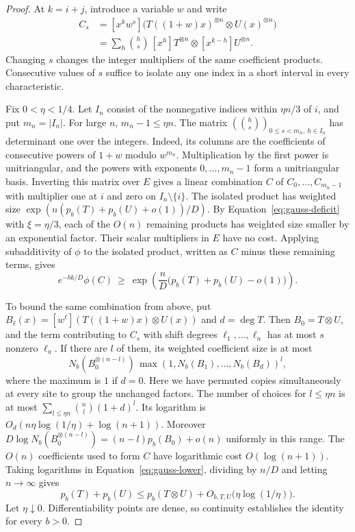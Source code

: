 \begin{proof}
At $k=i+j$, introduce a variable $w$ and write
\[
\begin{aligned}
 C_s
 &= [x^k w^s]\bigl(T((1+w)x)^{\otimes n}\otimes U(x)^{\otimes n}\bigr)\\
 &= \sum_h \binom hs\, [x^h]T^{\otimes n}\otimes[x^{k-h}]U^{\otimes n}.
\end{aligned}
\]
Changing $s$ changes the integer multipliers of the same coefficient
products. Consecutive values of $s$ suffice to isolate any one
index in a short interval in every characteristic.

Fix $0<\eta<1/4$. Let $I_n$ consist of the nonnegative indices within
$\eta n/3$ of $i$, and put $m_n=|I_n|$. For large $n$,
$m_n-1\le\eta n$. The matrix
$(\binom hs)_{0\le s<m_n,\ h\in I_n}$ has determinant one over
the integers. Indeed, its columns are the coefficients of consecutive
powers of $1+w$ modulo $w^{m_n}$. Multiplication by the first power is
unitriangular, and the powers with exponents $0,\ldots,m_n-1$ form
a unitriangular basis. Inverting this matrix over $E$ gives a linear
combination $C$ of $C_0,\ldots,C_{m_n-1}$ with multiplier one at $i$
and zero on $I_n\setminus\{i\}$. The isolated product has weighted
size $\exp(n(p_b(T)+p_b(U)+o(1))/D)$. By
Equation~\eqref{eq:gauss-deficit} with $\xi=\eta/3$, each of the
$O(n)$ remaining products has weighted size smaller by an exponential factor.
Their scalar multipliers in $E$ have no cost. Applying subadditivity
of $\phi$ to the isolated product, written as $C$ minus these
remaining terms, gives
\begin{equation}\label{eq:gauss-lower}
 e^{-bk/D}\phi(C)\ \ge\
 \exp\!\left(\frac nD\bigl(p_b(T)+p_b(U)-o(1)\bigr)\right).
\end{equation}

To bound the same combination from above, put
$B_\ell(x)=[w^\ell](T((1+w)x)\otimes U(x))$ and $d=\deg T$.
Then $B_0=T\otimes U$, and the term contributing to $C_s$ with
shift degrees $\ell_1,\ldots,\ell_n$ has at most $s$ nonzero
$\ell_a$. If there are $l$ of them, its weighted coefficient size
is at most
\[
 N_b(B_0^{\otimes(n-l)})\,\max(1,N_b(B_1),\ldots,N_b(B_d))^l,
\]
where the maximum is $1$ if $d=0$. Here we have permuted copies
simultaneously at every site to group the unchanged factors.
The number of choices for $l\le\eta n$ is at most
$\sum_{l\le\eta n}\binom nl(1+d)^l$. Its logarithm is
$O_d(n\eta\log(1/\eta)+\log(n+1))$. Moreover
$D\log N_b(B_0^{\otimes(n-l)})=(n-l)p_b(B_0)+o(n)$ uniformly in
this range. The $O(n)$ coefficients used to form $C$ have logarithmic
cost $O(\log(n+1))$. Taking logarithms in Equation~\eqref{eq:gauss-lower},
dividing by $n/D$ and letting $n\to\infty$ gives
\[
 p_b(T)+p_b(U)\le p_b(T\otimes U)+O_{b,T,U}\bigl(\eta\log(1/\eta)\bigr).
\]
Let $\eta\downarrow0$. Differentiability points are dense, so continuity
establishes the identity for every $b>0$.


\end{proof}
